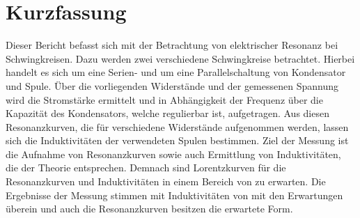 
\section{Kurzfassung}

Dieser Bericht befasst sich mit der Betrachtung von elektrischer Resonanz bei Schwingkreisen.
Dazu werden zwei verschiedene Schwingkreise betrachtet.
Hierbei handelt es sich um eine Serien- und um eine Parallelschaltung von Kondensator und Spule.
Über die vorliegenden Widerstände und der gemessenen Spannung wird die Stromstärke ermittelt und in Abhängigkeit der Frequenz über die Kapazität des Kondensators, welche regulierbar ist, aufgetragen.
Aus diesen Resonanzkurven, die für verschiedene Widerstände aufgenommen werden, lassen sich die Induktivitäten der verwendeten Spulen bestimmen.
Ziel der Messung ist die Aufnahme von Resonanzkurven sowie auch Ermittlung von Induktivitäten, die der Theorie entsprechen.
Demnach sind Lorentzkurven für die Resonanzkurven und Induktivitäten in einem Bereich von %
	zu erwarten.
Die Ergebnisse der Messung stimmen mit Induktivitäten von %
	mit den Erwartungen überein und auch die Resonanzkurven besitzen die erwartete Form.